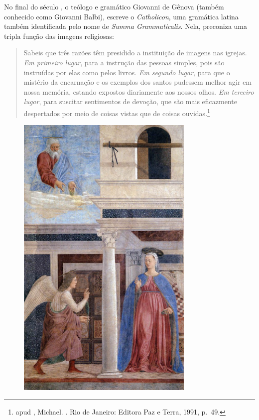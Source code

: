 \asterisc

No final do século , o teólogo e gramático Giovanni de Gênova
(também conhecido como Giovanni Balbi), escreve o \emph{Catholicon}, uma
gramática latina também identificada pelo nome de \emph{Summa
Grammaticalis}. Nela, preconiza uma tripla função das imagens
religiosas:

\begin{quote}
Sabeis que três razões têm presidido a instituição de imagens nas
igrejas. \emph{Em primeiro lugar}, para a instrução das pessoas simples,
pois são instruídas por elas como pelos livros. \emph{Em segundo lugar},
para que o mistério da encarnação e os exemplos dos santos pudessem
melhor agir em nossa memória, estando expostos diariamente aos nossos
olhos. \emph{Em terceiro lugar}, para suscitar sentimentos de devoção,
que são mais eficazmente despertados por meio de coisas vistas que de
coisas ouvidas.\footnote{ apud , Michael. {}. Rio de Janeiro: Editora Paz e Terra, 1991, p.~49.}
\end{quote}

\begin{figure}[!ht]
\centering
 \includegraphics[width=85mm]{./imgs/francesca.jpg}
\caption{\tiny{}}
\end{figure}


